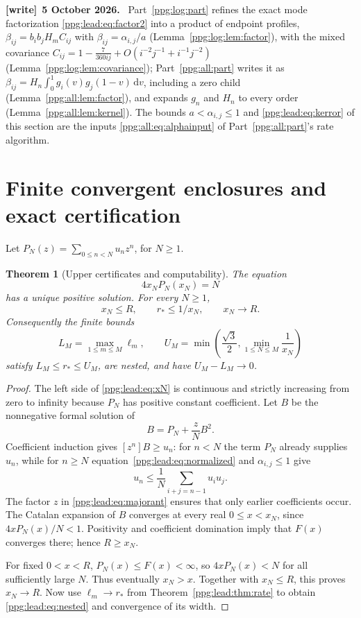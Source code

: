 \documentclass[11pt,letterpaper]{article}
\newtheorem{theorem}{Theorem}[section]
\theoremstyle{remark}\newtheorem{remark}[theorem]{Remark}
\numberwithin{equation}{section}
\newcommand{\dd}{\mathrm d}
\newenvironment{writenote}[1][]{\par\smallskip\begingroup\small
 \noindent\textbf{[write]}\if\relax\detokenize{#1}\relax\else~\textbf{#1.}\fi\ }%
 {\par\endgroup\smallskip}
\begin{document}
\begin{writenote}[5 October 2026]
Part~\ref{ppg:log:part} refines the exact mode factorization \eqref{ppg:lead:eq:factor2} into a product of endpoint profiles, $\beta_{ij}=b_ib_jH_mC_{ij}$ with $\beta_{ij}=\alpha_{i,j}/a$ (Lemma~\ref{ppg:log:lem:factor}), with the mixed covariance $C_{ij}=1-\frac7{360ij}+O(i^{-2}j^{-1}+i^{-1}j^{-2})$ (Lemma~\ref{ppg:log:lem:covariance}); Part~\ref{ppg:all:part} writes it as $\beta_{ij}=H_n\int_0^1g_i(v)g_j(1-v)\,\dd v$, including a zero child (Lemma~\ref{ppg:all:lem:factor}), and expands $g_n$ and $H_n$ to every order (Lemma~\ref{ppg:all:lem:kernel}). The bounds $a<\alpha_{i,j}\le1$ and \eqref{ppg:lead:eq:kerror} of this section are the inputs \eqref{ppg:all:eq:alphainput} of Part~\ref{ppg:all:part}'s rate algorithm.
\end{writenote}

\section{Finite convergent enclosures and exact certification}\label{ppg:lead:sec:certificates}
Let $P_N(z)=\sum_{0\le n<N}u_nz^n$, for $N\ge1$.
\begin{theorem}[Upper certificates and computability]\label{ppg:lead:thm:uppercert}
The equation
\begin{equation}\label{ppg:lead:eq:xN}
 4x_NP_N(x_N)=N
\end{equation}
has a unique positive solution. For every $N\ge1$,
\[
 x_N\le R,\qquad r_*\le1/x_N,\qquad x_N\longrightarrow R.
\]
Consequently the finite bounds
\begin{equation}\label{ppg:lead:eq:nested}
 L_M=\max_{1\le m\le M}\ell_m,\qquad
 U_M=\min\left(\frac{\sqrt3}{2},\min_{1\le N\le M}\frac1{x_N}\right)
\end{equation}
satisfy $L_M\le r_*\le U_M$, are nested, and have $U_M-L_M\to0$.
\end{theorem}
\begin{proof}
The left side of \eqref{ppg:lead:eq:xN} is continuous and strictly increasing from zero to infinity because $P_N$ has positive constant coefficient. Let $B$ be the nonnegative formal solution of
\begin{equation}\label{ppg:lead:eq:majorant}
 B=P_N+\frac zN B^2.
\end{equation}
Coefficient induction gives $[z^n]B\ge u_n$: for $n<N$ the term $P_N$ already supplies $u_n$, while for $n\ge N$ equation~\eqref{ppg:lead:eq:normalized} and $\alpha_{i,j}\le1$ give
\[
 u_n\le\frac1N\sum_{i+j=n-1}u_iu_j.
\]
The factor $z$ in \eqref{ppg:lead:eq:majorant} ensures that only earlier coefficients occur. The Catalan expansion of $B$ converges at every real $0\le x<x_N$, since $4xP_N(x)/N<1$. Positivity and coefficient domination imply that $F(x)$ converges there; hence $R\ge x_N$.

For fixed $0<x<R$, $P_N(x)\le F(x)<\infty$, so $4xP_N(x)<N$ for all sufficiently large $N$. Thus eventually $x_N>x$. Together with $x_N\le R$, this proves $x_N\to R$. Now use $\ell_m\to r_*$ from Theorem~\ref{ppg:lead:thm:rate} to obtain \eqref{ppg:lead:eq:nested} and convergence of its width.
\end{proof}
\end{document}
